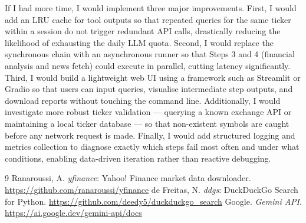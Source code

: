 \documentclass[11pt,a4paper]{article}
\begin{document}
If I had more time, I would implement three major improvements. First, I would add an LRU cache for tool outputs so that repeated queries for the same ticker within a session do not trigger redundant API calls, drastically reducing the likelihood of exhausting the daily LLM quota. Second, I would replace the synchronous chain with an asynchronous runner so that Steps 3 and 4 (financial analysis and news fetch) could execute in parallel, cutting latency significantly. Third, I would build a lightweight web UI using a framework such as Streamlit or Gradio so that users can input queries, visualise intermediate step outputs, and download reports without touching the command line. Additionally, I would investigate more robust ticker validation --- querying a known exchange API or maintaining a local ticker database --- so that non-existent symbols are caught before any network request is made. Finally, I would add structured logging and metrics collection to diagnose exactly which steps fail most often and under what conditions, enabling data-driven iteration rather than reactive debugging.

\begin{thebibliography}{9}
 Ranaroussi, A. \textit{yfinance}: Yahoo! Finance market data downloader. \url{https://github.com/ranaroussi/yfinance}
 de Freitas, N. \textit{ddgs}: DuckDuckGo Search for Python. \url{https://github.com/deedy5/duckduckgo_search}
 Google. \textit{Gemini API}. \url{https://ai.google.dev/gemini-api/docs}
\end{thebibliography}
\end{document}
